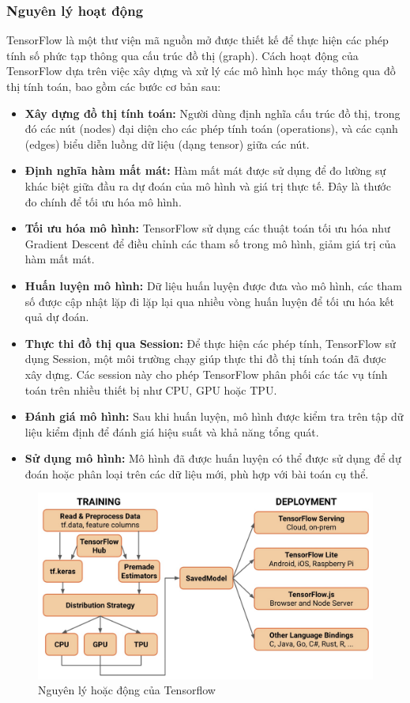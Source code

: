 \subsubsection{Nguyên lý hoạt động}
\indent TensorFlow là một thư viện mã nguồn mở được thiết kế để thực hiện các phép tính số phức tạp thông qua cấu trúc đồ thị (graph). Cách hoạt động của TensorFlow dựa trên việc xây dựng và xử lý các mô hình học máy thông qua đồ thị tính toán, bao gồm các bước cơ bản sau:

\begin{itemize}
    \item \textbf{Xây dựng đồ thị tính toán:} Người dùng định nghĩa cấu trúc đồ thị, trong đó các nút (nodes) đại diện cho các phép tính toán (operations), và các cạnh (edges) biểu diễn luồng dữ liệu (dạng tensor) giữa các nút.
    \item \textbf{Định nghĩa hàm mất mát:} Hàm mất mát được sử dụng để đo lường sự khác biệt giữa đầu ra dự đoán của mô hình và giá trị thực tế. Đây là thước đo chính để tối ưu hóa mô hình.
    \item \textbf{Tối ưu hóa mô hình:} TensorFlow sử dụng các thuật toán tối ưu hóa như Gradient Descent để điều chỉnh các tham số trong mô hình, giảm giá trị của hàm mất mát.
    \item \textbf{Huấn luyện mô hình:} Dữ liệu huấn luyện được đưa vào mô hình, các tham số được cập nhật lặp đi lặp lại qua nhiều vòng huấn luyện để tối ưu hóa kết quả dự đoán.
    \item \textbf{Thực thi đồ thị qua Session:} Để thực hiện các phép tính, TensorFlow sử dụng Session, một môi trường chạy giúp thực thi đồ thị tính toán đã được xây dựng. Các session này cho phép TensorFlow phân phối các tác vụ tính toán trên nhiều thiết bị như CPU, GPU hoặc TPU.
    \item \textbf{Đánh giá mô hình:} Sau khi huấn luyện, mô hình được kiểm tra trên tập dữ liệu kiểm định để đánh giá hiệu suất và khả năng tổng quát.
    \item \textbf{Sử dụng mô hình:} Mô hình đã được huấn luyện có thể được sử dụng để dự đoán hoặc phân loại trên các dữ liệu mới, phù hợp với bài toán cụ thể.
\end{itemize}
\begin{figure}[H]
    \centering
    \includegraphics[width=\textwidth,height=\textheight,keepaspectratio]{Images/Theoretical basis/nguyen-li-hoat-dong-tensorflow.jpeg}
    \caption{Nguyên lý hoặc động của Tensorflow}
    \label{fig:enter-label}
\end{figure}


